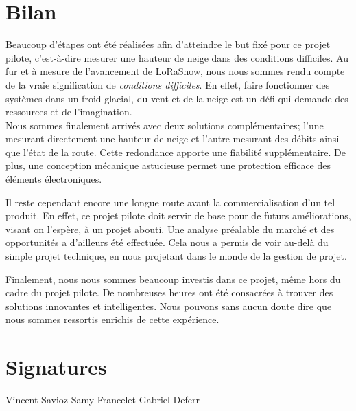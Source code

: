 \section{Bilan}

Beaucoup d'étapes ont été réalisées afin d'atteindre le but fixé pour ce projet pilote, c'est-à-dire 
mesurer une hauteur de neige dans des conditions difficiles. Au fur et à mesure de l'avancement de LoRaSnow,
nous nous sommes rendu compte de la vraie signification de \emph{conditions difficiles}. En effet, faire 
fonctionner des systèmes dans un froid glacial, du vent et de la neige est un défi qui demande des
ressources et de l'imagination.\\
Nous sommes finalement arrivés avec deux solutions complémentaires; l'une mesurant directement une hauteur 
de neige et l'autre mesurant des débits ainsi que l'état de la route. Cette redondance apporte une fiabilité
supplémentaire. De plus, une conception mécanique astucieuse permet une protection efficace des éléments 
électroniques.\par 
Il reste cependant encore une longue route avant la commercialisation d'un tel produit. En effet, ce projet 
pilote doit servir de base pour de futurs améliorations, visant on l'espère, à un projet abouti. Une analyse
préalable du marché et des opportunités a d'ailleurs été effectuée. Cela nous a permis de voir au-delà du
simple projet technique, en nous projetant dans le monde de la gestion de projet.\par 
Finalement, nous nous sommes beaucoup investis dans ce projet, même hors du cadre du projet pilote. De 
nombreuses heures ont été consacrées à trouver des solutions innovantes et intelligentes. Nous pouvons sans 
aucun doute dire que nous sommes ressortis enrichis de cette expérience.

\section{Signatures}

\vspace{\fill}
Vincent Savioz \hfill Samy Francelet \hfill Gabriel Deferr
\vspace{\fill}